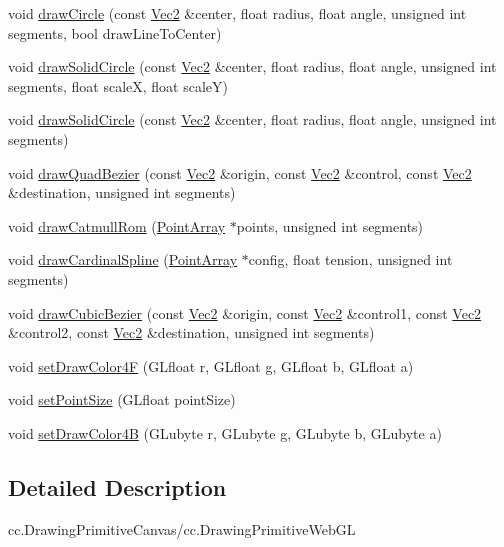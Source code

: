 \begin{DoxyCompactItemize}
\item 
void \hyperlink{namespaceDrawPrimitives_ae27b581bbeb1c73a0b01d3e1afb4c13e}{draw\+Circle} (const \hyperlink{classVec2}{Vec2} \&center, float radius, float angle, unsigned int segments, bool draw\+Line\+To\+Center)
\item 
void \hyperlink{namespaceDrawPrimitives_a323e0910a04cf0fdc75563e61a5dea15}{draw\+Solid\+Circle} (const \hyperlink{classVec2}{Vec2} \&center, float radius, float angle, unsigned int segments, float scaleX, float scaleY)
\item 
void \hyperlink{namespaceDrawPrimitives_a11ae341f043974e35ac301f9e3feef45}{draw\+Solid\+Circle} (const \hyperlink{classVec2}{Vec2} \&center, float radius, float angle, unsigned int segments)
\item 
void \hyperlink{namespaceDrawPrimitives_a350f5890844862176a8be86cdadfd291}{draw\+Quad\+Bezier} (const \hyperlink{classVec2}{Vec2} \&origin, const \hyperlink{classVec2}{Vec2} \&control, const \hyperlink{classVec2}{Vec2} \&destination, unsigned int segments)
\item 
void \hyperlink{namespaceDrawPrimitives_a133274f7f2a33cd32644d665e963ccd8}{draw\+Catmull\+Rom} (\hyperlink{classPointArray}{Point\+Array} $\ast$points, unsigned int segments)
\item 
void \hyperlink{namespaceDrawPrimitives_a82b0da83c69f4bbba9a26b4f1f90b1e1}{draw\+Cardinal\+Spline} (\hyperlink{classPointArray}{Point\+Array} $\ast$config, float tension, unsigned int segments)
\item 
void \hyperlink{namespaceDrawPrimitives_a430724952603bf1461fa0ee1106d154a}{draw\+Cubic\+Bezier} (const \hyperlink{classVec2}{Vec2} \&origin, const \hyperlink{classVec2}{Vec2} \&control1, const \hyperlink{classVec2}{Vec2} \&control2, const \hyperlink{classVec2}{Vec2} \&destination, unsigned int segments)
\item 
void \hyperlink{namespaceDrawPrimitives_a7407c702800e22e9a94a4d4ee551adbe}{set\+Draw\+Color4F} (G\+Lfloat r, G\+Lfloat g, G\+Lfloat b, G\+Lfloat a)
\item 
void \hyperlink{namespaceDrawPrimitives_a28cc32247764c0f33adf3f070bdaf989}{set\+Point\+Size} (G\+Lfloat point\+Size)
\item 
void \hyperlink{namespaceDrawPrimitives_aa174af76c4a9f5ae94fda0f5696a4d70}{set\+Draw\+Color4B} (G\+Lubyte r, G\+Lubyte g, G\+Lubyte b, G\+Lubyte a)
\end{DoxyCompactItemize}


\subsection{Detailed Description}
cc.\+Drawing\+Primitive\+Canvas/cc.Drawing\+Primitive\+Web\+GL 

